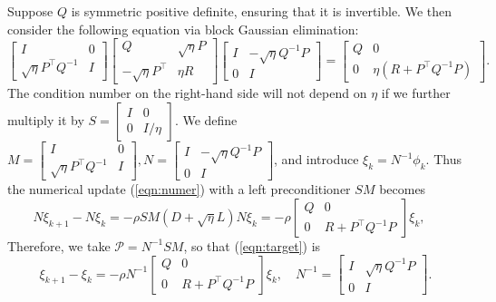\documentclass[11pt]{article}
\newcommand{\1}{\mathds{1}}
\begin{document}
Suppose $Q$ is symmetric positive definite, ensuring that it is invertible. We then consider the following equation via block Gaussian elimination:
\begin{equation}
\begin{bmatrix}
        I & 0\\
        \sqrt{\eta} P^\top Q^{-1} & I
    \end{bmatrix}
    \begin{bmatrix}
        Q & \sqrt{\eta} P\\
        -\sqrt{\eta} P^\top & \eta R
    \end{bmatrix}
    \begin{bmatrix}
        I & -\sqrt{\eta} Q^{-1}P\\
        0& I
    \end{bmatrix} = \begin{bmatrix}
        Q & 0\\
        0 & \eta( R+P^\top Q^{-1} P)
    \end{bmatrix}.
\end{equation}
The condition number on the right-hand side will not depend on $\eta$ if we further multiply it by $S=\begin{bmatrix}
        I & 0\\
        0 & I/\eta 
    \end{bmatrix}$.
We define $M = \begin{bmatrix}
        I & 0\\
        \sqrt{\eta} P^\top Q^{-1} & I
    \end{bmatrix}, N = \begin{bmatrix}
        I & -\sqrt{\eta} Q^{-1}P\\
        0& I
    \end{bmatrix}$, and introduce $\xi_k = N^{-1}\phi_k$. Thus the numerical update (\ref{eqn:numer}) with a left preconditioner $SM$ becomes
    \begin{equation}
        N\xi_{k+1} - N\xi_k = -\rho S M (D+\sqrt{\eta}L) N \xi_k = -\rho \begin{bmatrix}
        Q & 0\\
        0 &  R+P^\top Q^{-1} P
    \end{bmatrix}\xi_k, \quad 
    \end{equation}
Therefore, we take $\mathcal{P} = N^{-1}S M$, so that (\ref{eqn:target}) is
\begin{equation}
    \xi_{k+1} - \xi_k = -\rho N^{-1}\begin{bmatrix}
        Q & 0\\
        0 &  R+P^\top Q^{-1} P
    \end{bmatrix}\xi_k, \quad N^{-1} = \begin{bmatrix}
        I & \sqrt{\eta} Q^{-1}P\\
        0& I
    \end{bmatrix}.
\end{equation}
\end{document}
